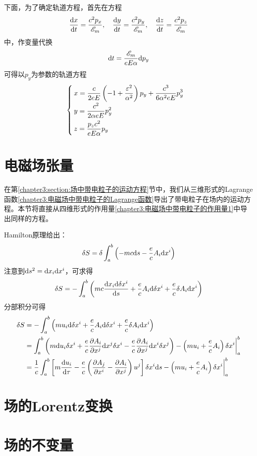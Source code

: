 \begin{solution}
下面，为了确定轨道方程，首先在方程
\begin{equation}
	\frac{\mathrm{d} x}{\mathrm{d} t} = \frac{c^2p_x}{\mathscr{E}_m},\quad \frac{\mathrm{d} y}{\mathrm{d} t} = \frac{c^2p_y}{\mathscr{E}_m},\quad \frac{\mathrm{d} z}{\mathrm{d} t} = \frac{c^2p_z}{\mathscr{E}_m}
\end{equation}
中，作变量代换
\begin{equation*}
	\mathrm{d} t = \frac{\mathscr{E}_m}{eE\alpha}\mathrm{d} p_y
\end{equation*}
可得以$p_y$为参数的轨道方程
\begin{equation}
\begin{cases}
	\displaystyle x = \frac{c}{2eE}\left(-1+\frac{\varepsilon^2}{\alpha^2}\right)p_y + \frac{c^3}{6\alpha^2eE}p_y^3 \\[1.5ex]
	\displaystyle y = \frac{c^2}{2\alpha eE}p_y^2 \\[1.5ex]
	\displaystyle z = \frac{p_zc^2}{eE\alpha}p_y
\end{cases}
\end{equation}
\end{solution}

\section{电磁场张量}

在第\ref{chapter3:section:场中带电粒子的运动方程}节中，我们从三维形式的Lagrange函数\eqref{chapter3:电磁场中带电粒子的Lagrange函数}导出了带电粒子在场内的运动方程。本节将直接从四维形式的作用量\eqref{chapter3:电磁场中带电粒子的作用量1}中导出同样的方程。

Hamilton原理给出：
\begin{equation}
	\delta S = \delta \int_a^b \left(-mc\mathrm{d} s-\frac{e}{c}A_i\mathrm{d} x^i\right)
	\label{chapter3:电磁场张量-电磁场的Hamilton原理1}
\end{equation}
注意到$\mathrm{d} s^2 = \mathrm{d} x_i\mathrm{d} x^i$，可求得
\begin{equation*}
	\delta S = -\int_a^b \left(mc\frac{\mathrm{d} x_i\mathrm{d} \delta x^i}{\mathrm{d} s} + \frac{e}{c}A_i\mathrm{d} \delta x^i + \frac{e}{c}\delta A_i\mathrm{d} x^i\right)
\end{equation*}
分部积分可得
\begin{align}
	\delta S & = -\int_a^b \left(mu_i\mathrm{d} \delta x^i + \frac{e}{c}A_i\mathrm{d} \delta x^i + \frac{e}{c}\delta A_i\mathrm{d} x^i\right) \nonumber \\
	& = \int_a^b \left(m\mathrm{d} u_i \delta x^i + \frac{e}{c}\frac{\partial A_i}{\partial x^j}\mathrm{d} x^j\delta x^i - \frac{e}{c} \frac{\partial A_i}{\partial x^j}\mathrm{d} x^i \delta x^j\right) - \left(mu_i+\frac{e}{c}A_i\right)\delta x^i\bigg|_a^b \nonumber \\
	& = \frac1c \int_a^b \left[m\frac{\mathrm{d} u_i}{\mathrm{d} \tau} - \frac{e}{c}\left(\frac{\partial A_j}{\partial x^i} - \frac{\partial A_i}{\partial x^j}\right) u^j\right] \delta x^i\mathrm{d} s - \left(mu_i+\frac{e}{c}A_i\right)\delta x^i\bigg|_a^b
	\label{chapter3:电磁场张量-电磁场的Hamilton原理2}
\end{align}

\section{场的Lorentz变换}

\section{场的不变量}\label{chapter3:section:场的不变量}
